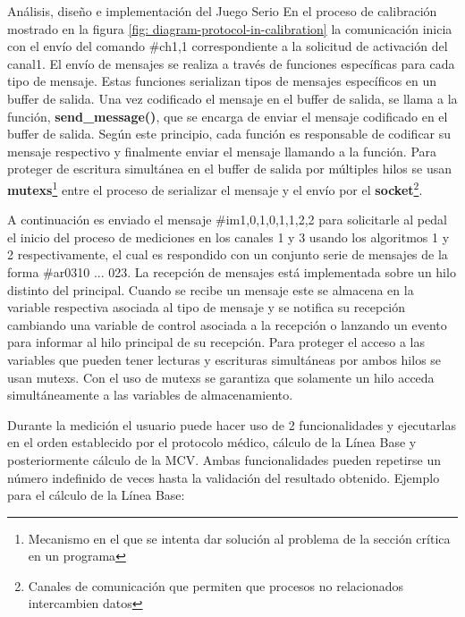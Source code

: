 \begin{thesischapter}{2} {Análisis, diseño e implementación del Juego Serio}
    \vspace{100pt}   
    En el proceso de calibración mostrado en la figura \ref{fig: diagram-protocol-in-calibration} 
    la comunicación inicia con el envío del comando \#ch1,1 
    correspondiente a la solicitud de activación  del canal1. El envío de mensajes se realiza 
    a través de funciones específicas para cada tipo de mensaje.
    Estas funciones serializan tipos de mensajes específicos en un buffer de salida. Una vez
    codificado el mensaje en el buffer de salida, se llama a la función,
    \textbf{send\_message()}, que se encarga de enviar el mensaje codificado en el buffer
    de salida. Según este principio, cada función es responsable de codificar su mensaje
    respectivo y finalmente enviar el mensaje llamando a la función. Para proteger
    de escritura simultánea en el buffer de salida por múltiples hilos se usan 
    \textbf{mutexs}\footnote{Mecanismo en el que se intenta dar solución al problema de la sección crítica en un programa} entre el
    proceso de serializar el mensaje y el envío por el {\textbf{socket}}\footnote{Canales de comunicación que permiten que procesos no relacionados intercambien datos}. 
    
    \vspace{10pt}
    A continuación es enviado el mensaje \#im1,0,1,0,1,1,2,2 para solicitarle al pedal el inicio 
    del proceso de mediciones en los canales 1 y 3 usando los algoritmos 1 y 2 respectivamente, el 
    cual es respondido con un conjunto serie de mensajes de la forma \#ar0310 ... 023. La recepción 
    de mensajes está implementada sobre un hilo distinto del principal. Cuando se 
    recibe un mensaje este se almacena en la variable respectiva
    asociada al tipo de mensaje y se notifica su recepción cambiando una variable de control
    asociada a la recepción o lanzando un evento para informar al hilo principal de su
    recepción. Para proteger el acceso a las variables que pueden tener lecturas y escrituras
    simultáneas por ambos hilos se usan mutexs. Con el uso de mutexs se garantiza que
    solamente un hilo acceda simultáneamente a las variables de almacenamiento. 

    \vspace{10pt}
    Durante la medición el usuario puede hacer uso de 2 funcionalidades y ejecutarlas en el orden 
    establecido por el protocolo médico, cálculo de la Línea Base y posteriormente cálculo de la MCV.
    Ambas funcionalidades pueden repetirse un número indefinido de veces hasta la validación del resultado 
    obtenido. Ejemplo para el cálculo de la Línea Base:
    

\end{thesischapter}
